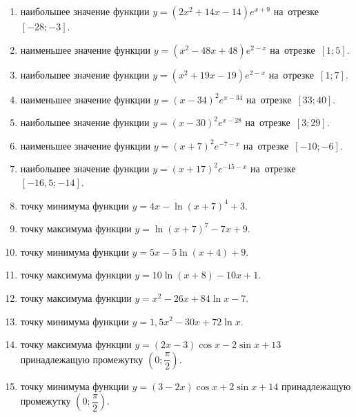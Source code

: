 \documentclass[a4paper,10pt]{article}
\begin{document}
\begin{enumerate}
\item {} наибольшее значение функции $y=\left(2x^2 +14x -14\right)e^{x+9}$ на~отрезке~$\left[-28;-3\right]$.

\item {} наименьшее значение функции $y=\left(x^2 -48x +48\right)e^{2-x}$ на~отрезке~$\left[1;5\right]$.

\item {} наибольшее значение функции $y=\left(x^2 +19x -19\right)e^{2-x}$ на~отрезке~$\left[1;7\right]$.

\item {} наименьшее значение функции $y=\left(x-34\right)^2e^{x-34}$ на~отрезке~$\left[33;40\right]$.

\item {} наибольшее значение функции $y=\left(x-30\right)^2e^{x-28}$ на~отрезке~$\left[3;29\right]$.

\item {} наименьшее значение функции $y=\left(x+7\right)^2e^{-7-x}$ на~отрезке~$\left[-10;-6\right]$.

\item {} наибольшее значение функции $y=\left(x+17\right)^2e^{-15-x}$ на~отрезке~$\left[-16,5;-14\right]$.

\item {} точку минимума функции $y=4x-\ln\left(x+7\right)^{4}+3$.

\item {} точку максимума функции $y=\ln\left(x+7\right)^{7}-7x+9$.

\item {} точку минимума функции $y=5x-5\ln\left(x+4\right)+9$.

\item {} точку максимума функции $y=10\ln\left(x+8\right)-10x+1$.

\item {} точку максимума функции $y=x^2-26x+84\ln x -7$.

\item {} точку минимума функции $y=1,5x^2-30x+72\ln x $.

\item {} точку максимума функции $y=\left(2x-3\right)\cos x -2\sin x+13$
принадлежащую промежутку $\left(0;\dfrac{\pi}{2}\right)$.

\item {} точку минимума функции $y=\left(3-2x\right)\cos x +2\sin x+14$
принадлежащую промежутку $\left(0;\dfrac{\pi}{2}\right)$.


\end{enumerate}
\end{document}
